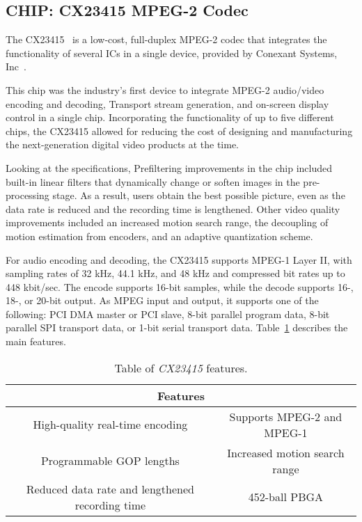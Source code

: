 \subsection{CHIP: CX23415 MPEG-2 Codec}

The CX23415~\cite{cx23415} is a low-cost, full-duplex MPEG-2 codec that integrates the functionality of several ICs in a single device, provided by Conexant Systems, Inc~\cite{conexant}.

This chip was the industry's first device to integrate MPEG-2 audio/video encoding and decoding, Transport stream generation, and on-screen display control in a single chip. Incorporating the functionality of up to five different chips, the CX23415 allowed for reducing the cost of designing and manufacturing the next-generation digital video products at the time.

Looking at the specifications, Prefiltering improvements in the chip included built-in linear filters that dynamically change or soften images in the pre-processing stage. As a result, users obtain the best possible picture, even as the data rate is reduced and the recording time is lengthened. Other video quality improvements included an increased motion search range, the decoupling of motion estimation from encoders, and an adaptive quantization scheme. 


For audio encoding and decoding, the CX23415 supports MPEG-1 Layer II, with sampling rates of 32 kHz, 44.1 kHz, and 48 kHz and compressed bit rates up to 448 kbit/sec. The encode supports 16-bit samples, while the decode supports 16-, 18-, or 20-bit output.
As MPEG input and output, it supports one of the following: PCI DMA master or PCI slave, 8-bit parallel program data, 8-bit parallel SPI transport data, or 1-bit serial transport data.
Table~\ref{tab:cx} describes the main features.

\begin{table}[h]
    \centering
    \begin{tabular}{|c|c|}
        \hline
        \multicolumn{2}{|c|}{\textbf{Features}} \\
        \hline
         High-quality real-time encoding & Supports MPEG-2 and MPEG-1 \\
         \hline
         Programmable GOP lengths & Increased motion search range \\
         \hline
         Reduced data rate and lengthened recording time & 452-ball PBGA \\
         \hline
    \end{tabular}
    \caption{Table of \textit{CX23415} features.}
    \label{tab:cx}
\end{table}

